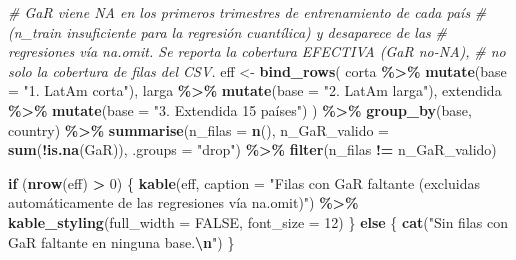 \documentclass[
]{article}
\newenvironment{Shaded}{\begin{snugshade}}{\end{snugshade}}
\newcommand{\AttributeTok}[1]{\textcolor[rgb]{0.13,0.29,0.53}{#1}}
\newcommand{\CommentTok}[1]{\textcolor[rgb]{0.56,0.35,0.01}{\textit{#1}}}
\newcommand{\ConstantTok}[1]{\textcolor[rgb]{0.56,0.35,0.01}{#1}}
\newcommand{\ControlFlowTok}[1]{\textcolor[rgb]{0.13,0.29,0.53}{\textbf{#1}}}
\newcommand{\DecValTok}[1]{\textcolor[rgb]{0.00,0.00,0.81}{#1}}
\newcommand{\FunctionTok}[1]{\textcolor[rgb]{0.13,0.29,0.53}{\textbf{#1}}}
\newcommand{\NormalTok}[1]{#1}
\newcommand{\OtherTok}[1]{\textcolor[rgb]{0.56,0.35,0.01}{#1}}
\newcommand{\SpecialCharTok}[1]{\textcolor[rgb]{0.81,0.36,0.00}{\textbf{#1}}}
\newcommand{\StringTok}[1]{\textcolor[rgb]{0.31,0.60,0.02}{#1}}
\begin{document}
\begin{Shaded}
\begin{Highlighting}[]
\CommentTok{\# GaR viene NA en los primeros trimestres de entrenamiento de cada país}
\CommentTok{\# (n\_train insuficiente para la regresión cuantílica) y desaparece de las}
\CommentTok{\# regresiones vía na.omit. Se reporta la cobertura EFECTIVA (GaR no{-}NA),}
\CommentTok{\# no solo la cobertura de filas del CSV.}
\NormalTok{eff }\OtherTok{\textless{}{-}} \FunctionTok{bind\_rows}\NormalTok{(}
\NormalTok{  corta     }\SpecialCharTok{\%\textgreater{}\%} \FunctionTok{mutate}\NormalTok{(}\AttributeTok{base =} \StringTok{"1. LatAm corta"}\NormalTok{),}
\NormalTok{  larga     }\SpecialCharTok{\%\textgreater{}\%} \FunctionTok{mutate}\NormalTok{(}\AttributeTok{base =} \StringTok{"2. LatAm larga"}\NormalTok{),}
\NormalTok{  extendida }\SpecialCharTok{\%\textgreater{}\%} \FunctionTok{mutate}\NormalTok{(}\AttributeTok{base =} \StringTok{"3. Extendida 15 países"}\NormalTok{)}
\NormalTok{) }\SpecialCharTok{\%\textgreater{}\%}
  \FunctionTok{group\_by}\NormalTok{(base, country) }\SpecialCharTok{\%\textgreater{}\%}
  \FunctionTok{summarise}\NormalTok{(}\AttributeTok{n\_filas =} \FunctionTok{n}\NormalTok{(), }\AttributeTok{n\_GaR\_valido =} \FunctionTok{sum}\NormalTok{(}\SpecialCharTok{!}\FunctionTok{is.na}\NormalTok{(GaR)), }\AttributeTok{.groups =} \StringTok{"drop"}\NormalTok{) }\SpecialCharTok{\%\textgreater{}\%}
  \FunctionTok{filter}\NormalTok{(n\_filas }\SpecialCharTok{!=}\NormalTok{ n\_GaR\_valido)}

\ControlFlowTok{if}\NormalTok{ (}\FunctionTok{nrow}\NormalTok{(eff) }\SpecialCharTok{\textgreater{}} \DecValTok{0}\NormalTok{) \{}
  \FunctionTok{kable}\NormalTok{(eff, }\AttributeTok{caption =} \StringTok{"Filas con GaR faltante (excluidas automáticamente de las regresiones vía na.omit)"}\NormalTok{) }\SpecialCharTok{\%\textgreater{}\%}
    \FunctionTok{kable\_styling}\NormalTok{(}\AttributeTok{full\_width =} \ConstantTok{FALSE}\NormalTok{, }\AttributeTok{font\_size =} \DecValTok{12}\NormalTok{)}
\NormalTok{\} }\ControlFlowTok{else}\NormalTok{ \{}
  \FunctionTok{cat}\NormalTok{(}\StringTok{"Sin filas con GaR faltante en ninguna base.}\SpecialCharTok{\textbackslash{}n}\StringTok{"}\NormalTok{)}
\NormalTok{\}}
\end{Highlighting}
\end{Shaded}

\begingroup\fontsize{12}{14}\selectfont
\end{document}
